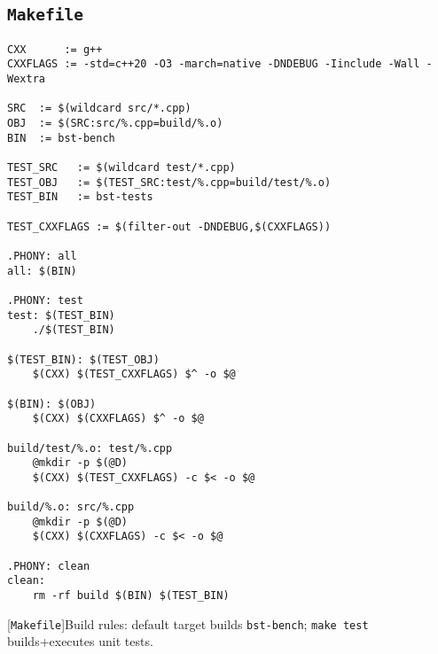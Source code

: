 \subsection{\texttt{Makefile}}
\label{secsec:makefile}
\begin{lstlisting}
CXX      := g++
CXXFLAGS := -std=c++20 -O3 -march=native -DNDEBUG -Iinclude -Wall -Wextra

SRC  := $(wildcard src/*.cpp)
OBJ  := $(SRC:src/%.cpp=build/%.o)
BIN  := bst-bench

TEST_SRC   := $(wildcard test/*.cpp)
TEST_OBJ   := $(TEST_SRC:test/%.cpp=build/test/%.o)
TEST_BIN   := bst-tests

TEST_CXXFLAGS := $(filter-out -DNDEBUG,$(CXXFLAGS))

.PHONY: all
all: $(BIN)

.PHONY: test
test: $(TEST_BIN)
	./$(TEST_BIN)

$(TEST_BIN): $(TEST_OBJ)
	$(CXX) $(TEST_CXXFLAGS) $^ -o $@

$(BIN): $(OBJ)
	$(CXX) $(CXXFLAGS) $^ -o $@

build/test/%.o: test/%.cpp
	@mkdir -p $(@D)
	$(CXX) $(TEST_CXXFLAGS) -c $< -o $@

build/%.o: src/%.cpp
	@mkdir -p $(@D)
	$(CXX) $(CXXFLAGS) -c $< -o $@

.PHONY: clean
clean:
	rm -rf build $(BIN) $(TEST_BIN)

\end{lstlisting}
[\texttt{Makefile}]{Build rules: default target builds
\texttt{bst-bench}; \texttt{make test} builds+executes unit tests.}
\label{lst:makefile}




